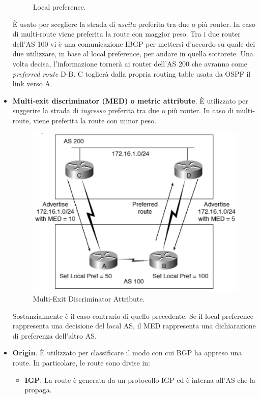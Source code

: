 \begin{itemize}
\begin{figure}[htbp]
			\caption{Local preference.}
			\label{img:local-preference}
		\end{figure}
	È usato per scegliere la strada di \textit{uscita} preferita tra due o più router. In caso di multi-route viene preferita la route con maggior peso. Tra i due router dell'AS 100 vi è una comunicazione IBGP per mettersi d'accordo su quale dei due utilizzare, in base al local preference, per andare in quella sottorete. Una volta decisa, l'informazione tornerà ai router dell'AS 200 che avranno come \textit{preferred route} D-B. C toglierà dalla propria routing table usata da OSPF il link verso A.
	\item \textbf{Multi-exit discriminator (MED) o metric attribute}. È utilizzato per suggerire la strada di \textit{ingresso} preferita tra due o più router. In caso di multi-route, viene preferita la route con minor peso.
		\begin{figure}[htbp]
			\centering
			\includegraphics[scale = 0.4]{images/MED}
			\caption{Multi-Exit Discriminator Attribute.}
			\label{img:med}
		\end{figure}
	Sostanzialmente è il caso contrario di quello precedente. Se il local preference rappresenta una decisione del local AS, il MED rappresenta una dichiarazione di preferenza dell'altro AS.
	\item \textbf{Origin}. È utilizzato per classificare il modo con cui BGP ha appreso una route. In particolare, le route sono divise in:
	\begin{itemize}
		\item \textbf{IGP}. La route è generata da un protocollo IGP ed è interna all'AS che la propaga.

\end{itemize}
\end{itemize}

